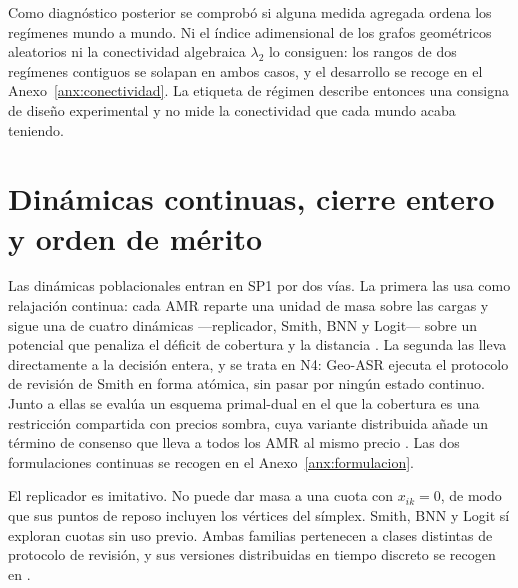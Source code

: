 \documentclass[12pt,a4paper]{article}
\theoremstyle{remark}
\theoremstyle{plain}
\begin{document}
Como diagnóstico posterior se comprobó si alguna medida agregada ordena los
regímenes mundo a mundo. Ni el índice adimensional de los grafos geométricos
aleatorios \citep{penrose2003RandomGeometric} ni la conectividad algebraica
$\lambda_2$ lo consiguen: los rangos de dos regímenes contiguos se solapan en
ambos casos, y el desarrollo se recoge en el Anexo~\ref{anx:conectividad}. La
etiqueta de régimen describe entonces una consigna de diseño experimental y no
mide la conectividad que cada mundo acaba teniendo.



\section{Dinámicas continuas, cierre entero y orden de mérito}

Las dinámicas poblacionales entran en SP1 por dos vías. La primera las usa como
relajación continua: cada AMR reparte una unidad de masa sobre las cargas y
sigue una de cuatro dinámicas ---replicador, Smith, BNN y Logit--- sobre un
potencial que penaliza el déficit de cobertura y la distancia
\citep{sandholm2010population,quijano2017population}. La segunda las lleva
directamente a la decisión entera, y se trata en N4: Geo-ASR ejecuta el
protocolo de revisión de Smith en forma atómica, sin pasar por ningún estado
continuo. Junto a ellas se evalúa un esquema primal-dual en el que la cobertura
es una restricción compartida con precios sombra, cuya variante distribuida
añade un término de consenso que lleva a todos los AMR al mismo precio
\citep{yi2019operatorGNE,franci2022stochasticGNE}. Las dos formulaciones
continuas se recogen en el Anexo~\ref{anx:formulacion}.


El replicador es imitativo. No puede dar masa a una cuota con $x_{ik}=0$, de modo
que sus puntos de reposo incluyen los vértices del símplex. Smith, BNN y Logit sí
exploran cuotas sin uso previo. Ambas familias pertenecen a clases distintas de
protocolo de revisión, y sus versiones distribuidas en tiempo discreto se recogen
en \citet{martinezPiazuelo2022Population}.
\end{document}
